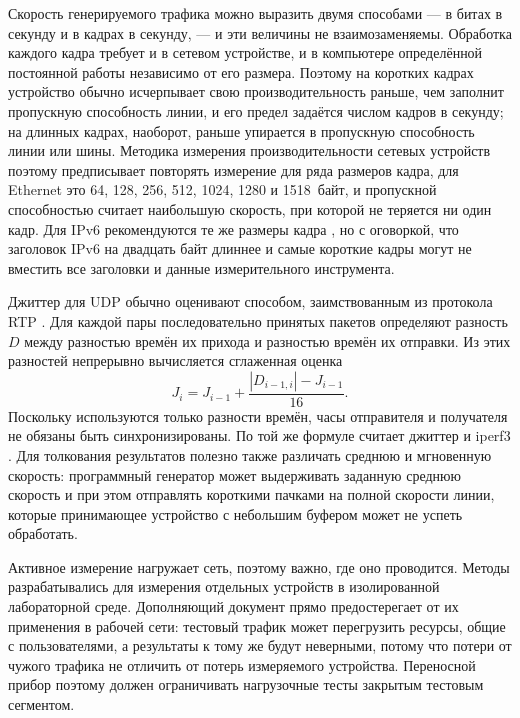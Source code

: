 Скорость генерируемого трафика можно выразить двумя способами — в битах в секунду и в кадрах в секунду, — и эти величины не взаимозаменяемы. Обработка каждого кадра требует и в сетевом устройстве, и в компьютере определённой постоянной работы независимо от его размера. Поэтому на коротких кадрах устройство обычно исчерпывает свою производительность раньше, чем заполнит пропускную способность линии, и его предел задаётся числом кадров в секунду; на длинных кадрах, наоборот, раньше упирается в пропускную способность линии или шины. Методика измерения производительности сетевых устройств \cite{rfc2544} поэтому предписывает повторять измерение для ряда размеров кадра, для Ethernet это 64, 128, 256, 512, 1024, 1280 и 1518~байт, и пропускной способностью считает наибольшую скорость, при которой не теряется ни один кадр. Для IPv6 рекомендуются те же размеры кадра \cite{rfc5180}, но с оговоркой, что заголовок IPv6 на двадцать байт длиннее и самые короткие кадры могут не вместить все заголовки и данные измерительного инструмента.

Джиттер для UDP обычно оценивают способом, заимствованным из протокола RTP \cite{rfc3550}. Для каждой пары последовательно принятых пакетов определяют разность $D$ между разностью времён их прихода и разностью времён их отправки. Из этих разностей непрерывно вычисляется сглаженная оценка
\begin{equation}
    J_i = J_{i-1} + \frac{|D_{i-1,i}| - J_{i-1}}{16}.
    \label{eq:jitter}
\end{equation}
Поскольку используются только разности времён, часы отправителя и получателя не обязаны быть синхронизированы. По той же формуле считает джиттер и iperf3 \cite{iperf3}. Для толкования результатов полезно также различать среднюю и мгновенную скорость: программный генератор может выдерживать заданную среднюю скорость и при этом отправлять короткими пачками на полной скорости линии, которые принимающее устройство с небольшим буфером может не успеть обработать.

Активное измерение нагружает сеть, поэтому важно, где оно проводится. Методы \cite{rfc2544} разрабатывались для измерения отдельных устройств в изолированной лабораторной среде. Дополняющий документ \cite{rfc6815} прямо предостерегает от их применения в рабочей сети: тестовый трафик может перегрузить ресурсы, общие с пользователями, а результаты к тому же будут неверными, потому что потери от чужого трафика не отличить от потерь измеряемого устройства. Переносной прибор поэтому должен ограничивать нагрузочные тесты закрытым тестовым сегментом.

